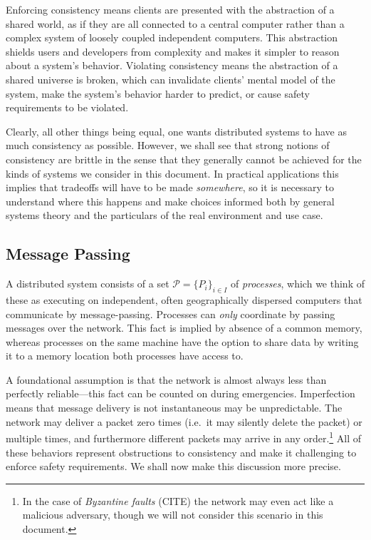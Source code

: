 \documentclass[]             %
{NASA}                       %
\theoremstyle{definition}
\begin{document}
Enforcing consistency means clients are presented with the abstraction
of a shared world, as if they are all connected to a central computer
rather than a complex system of loosely coupled independent computers.
This abstraction shields users and developers from complexity and makes
it simpler to reason about a system's behavior. Violating consistency
means the abstraction of a shared universe is broken, which can
invalidate clients' mental model of the system, make the system's
behavior harder to predict, or cause safety requirements to be violated.

Clearly, all other things being equal, one wants distributed systems to
have as much consistency as possible. However, we shall see that strong
notions of consistency are brittle in the sense that they generally
cannot be achieved for the kinds of systems we consider in this
document. In practical applications this implies that tradeoffs will
have to be made \emph{somewhere}, so it is necessary to understand where
this happens and make choices informed both by general systems theory
and the particulars of the real environment and use case.

\subsection{Message Passing}\label{message-passing}

A distributed system consists of a set
\(\mathcal{P} = \{P_i\}_{i\in I}\) of \emph{processes}, which we think
of these as executing on independent, often geographically dispersed
computers that communicate by message-passing. Processes can \emph{only}
coordinate by passing messages over the network. This fact is implied by
absence of a common memory, whereas processes on the same machine have
the option to share data by writing it to a memory location both
processes have access to.

A foundational assumption is that the network is almost always less than
perfectly reliable---this fact can be counted on during emergencies.
Imperfection means that message delivery is not instantaneous may be
unpredictable. The network may deliver a packet zero times (i.e.~it may
silently delete the packet) or multiple times, and furthermore different
packets may arrive in any order.\footnote{In the case of \emph{Byzantine
  faults} (CITE) the network may even act like a malicious adversary,
  though we will not consider this scenario in this document.} All of
these behaviors represent obstructions to consistency and make it
challenging to enforce safety requirements. We shall now make this
discussion more precise.
\end{document}
